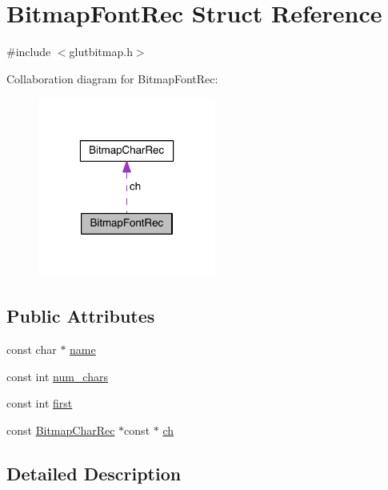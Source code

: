 \hypertarget{struct_bitmap_font_rec}{\section{Bitmap\-Font\-Rec Struct Reference}
\label{struct_bitmap_font_rec}
}


{\ttfamily \#include $<$glutbitmap.\-h$>$}



Collaboration diagram for Bitmap\-Font\-Rec\-:
\nopagebreak
\begin{figure}[H]
\begin{center}
\leavevmode
\includegraphics[width=166pt]{struct_bitmap_font_rec__coll__graph}
\end{center}
\end{figure}
\subsection*{Public Attributes}
\begin{DoxyCompactItemize}
\item 
const char $\ast$ \hyperlink{struct_bitmap_font_rec_ad70b2bdb7beb381ac3e6aaab7742a6cf}{name}
\item 
const int \hyperlink{struct_bitmap_font_rec_a02dcce32386981a7860d7eb63e610a6f}{num\-\_\-chars}
\item 
const int \hyperlink{struct_bitmap_font_rec_ae3fa065bd6cb89438656029968f38a37}{first}
\item 
const \hyperlink{struct_bitmap_char_rec}{Bitmap\-Char\-Rec} $\ast$const $\ast$ \hyperlink{struct_bitmap_font_rec_a5dc1989a9be5be061a6fe71affff15be}{ch}
\end{DoxyCompactItemize}


\subsection{Detailed Description}


